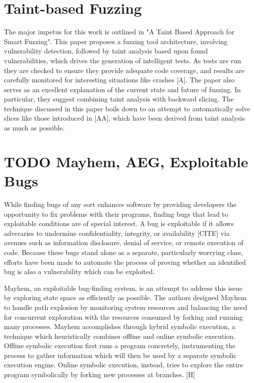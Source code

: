 \documentclass[11pt,expanded,copyright]{fsuthesis}
\begin{document}
\section{Taint-based Fuzzing}

The major impetus for this work is outlined in "A Taint Based Approach for Smart Fuzzing". This paper proposes a fuzzing tool architecture, involving vulnerability detection, followed by taint analysis based upon found vulnerabilities, which drives the generation of intelligent tests. As tests are run they are checked to ensure they provide adequate code coverage, and results are carefully monitored for interesting situations like crashes [A]. The paper also serves as an excellent explanation of the current state and future of fuzzing. In particular, they suggest combining taint analysis with backward slicing. The technique discussed in this paper boils down to an attempt to automatically solve slices like those introduced in [AA], which have been derived from taint analysis as much as possible.

\section{TODO Mayhem, AEG, Exploitable Bugs}


While finding bugs of any sort enhances software by providing developers the opportunity to fix problems with their programs, finding bugs that lead to exploitable conditions are of special interest. A bug is exploitable if it allows adveraries to undermine confidentiality, integrity, or availability [CITE] via avenues such as information disclosure, denial of service, or remote execution of code. Because these bugs stand alone as a separate, particularly worrying class, efforts have been made to automate the process of proving whether an identified bug is also a vulnerability which can be exploited.

Mayhem, an exploitable bug-finding system, is an attempt to address this issue by exploring state space as efficiently as possible. The authors designed Mayhem to handle path explosion by monitoring system resources and balancing the need for concurrent exploration with the resources consumed by forking and running many processes. Mayhem accomplishes through hybrid symbolic execution, a technique which heuristically combines offline and online symbolic execution. Offline symbolic execution first runs a program concretely, instrumenting the process to gather information which will then be used by a separate symbolic execution engine. Online symbolic execution, instead, tries to explore the entire program symbolically by forking new processes at branches. [H]
\end{document}
